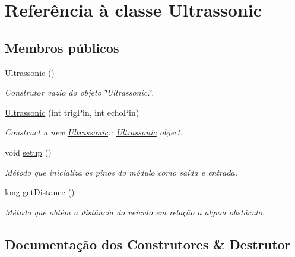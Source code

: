 \hypertarget{class_ultrassonic}{}\section{Referência à classe Ultrassonic}
\label{class_ultrassonic}
\subsection*{Membros públicos}
\begin{DoxyCompactItemize}
\item 
\mbox{\label{class_ultrassonic_ab6d154bfb6577056dc5e0db5336a6498}} 
\mbox{\hyperlink{class_ultrassonic_ab6d154bfb6577056dc5e0db5336a6498}{Ultrassonic}} ()
\begin{DoxyCompactList}\small\item\em Construtor vazio do objeto \char`\"{}\+Ultrassonic.\char`\"{}. \end{DoxyCompactList}\item 
\mbox{\hyperlink{class_ultrassonic_a4c8923af05e968747c4fb2ae3ee4903a}{Ultrassonic}} (int trig\+Pin, int echo\+Pin)
\begin{DoxyCompactList}\small\item\em Construct a new \mbox{\hyperlink{class_ultrassonic}{Ultrassonic}}\+:\+: \mbox{\hyperlink{class_ultrassonic}{Ultrassonic}} object. \end{DoxyCompactList}\item 
\mbox{\label{class_ultrassonic_a9f0db6928a17ca52c76aff7cabfd0a9f}} 
void \mbox{\hyperlink{class_ultrassonic_a9f0db6928a17ca52c76aff7cabfd0a9f}{setup}} ()
\begin{DoxyCompactList}\small\item\em Método que inicializa os pinos do módulo como saída e entrada. \end{DoxyCompactList}\item 
long \mbox{\hyperlink{class_ultrassonic_abe7782c662c69ad7e35b66d29bab76ec}{get\+Distance}} ()
\begin{DoxyCompactList}\small\item\em Método que obtém a distância do veículo em relação a algum obstáculo. \end{DoxyCompactList}\end{DoxyCompactItemize}


\subsection{Documentação dos Construtores \& Destrutor}
\mbox{\label{class_ultrassonic_a4c8923af05e968747c4fb2ae3ee4903a}} 
